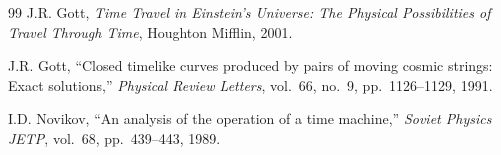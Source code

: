\documentclass[12pt,a4paper]{article}
\theoremstyle{plain}
\theoremstyle{definition}
\begin{document}
\begin{thebibliography}{99}
J.R. Gott, \textit{Time Travel in Einstein's Universe: The Physical Possibilities of Travel Through Time}, Houghton Mifflin, 2001.

J.R. Gott, ``Closed timelike curves produced by pairs of moving cosmic strings: Exact solutions,'' \textit{Physical Review Letters}, vol.~66, no.~9, pp.~1126--1129, 1991.

I.D. Novikov, ``An analysis of the operation of a time machine,'' \textit{Soviet Physics JETP}, vol.~68, pp.~439--443, 1989.

\end{thebibliography}

\end{document}
